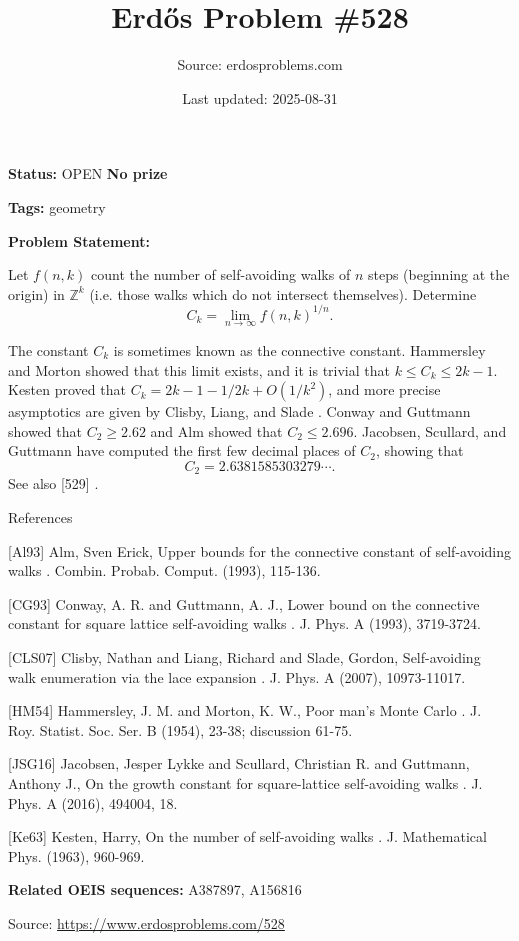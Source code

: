 \documentclass{article}
\title{Erd\H{o}s Problem \#528}
\date{Last updated: 2025-08-31}
\author{Source: erdosproblems.com}
\begin{document}
\maketitle

\noindent\textbf{Status:} OPEN \quad \textbf{No prize}

\noindent\textbf{Tags:} geometry

\medskip

\noindent\textbf{Problem Statement:}

Let $f(n,k)$ count the number of self-avoiding walks of $n$ steps (beginning at the origin) in $\mathbb{Z}^k$ (i.e. those walks which do not intersect themselves). Determine\[C_k=\lim_{n\to\infty}f(n,k)^{1/n}.\]




The constant $C_k$ is sometimes known as the connective constant. Hammersley and Morton \cite{HM54} showed that this limit exists, and it is trivial that $k\leq C_k\leq 2k-1$. Kesten \cite{Ke63} proved that $C_k=2k-1-1/2k+O(1/k^2)$, and more precise asymptotics are given by Clisby, Liang, and Slade \cite{CLS07}. Conway and Guttmann \cite{CG93} showed that $C_2\geq 2.62$ and Alm \cite{Al93} showed that $C_2\leq 2.696$. Jacobsen, Scullard, and Guttmann \cite{JSG16} have computed the first few decimal places of $C_2$, showing that\[C_2 = 2.6381585303279\cdots.\]See also [529] .




References

[Al93] Alm, Sven Erick, Upper bounds for the connective constant of self-avoiding walks . Combin. Probab. Comput. (1993), 115-136.

[CG93] Conway, A. R. and Guttmann, A. J., Lower bound on the connective constant for square lattice self-avoiding walks . J. Phys. A (1993), 3719-3724.

[CLS07] Clisby, Nathan and Liang, Richard and Slade, Gordon, Self-avoiding walk enumeration via the lace expansion . J. Phys. A (2007), 10973-11017.

[HM54] Hammersley, J. M. and Morton, K. W., Poor man's Monte Carlo . J. Roy. Statist. Soc. Ser. B (1954), 23-38; discussion 61-75.

[JSG16] Jacobsen, Jesper Lykke and Scullard, Christian R. and Guttmann, Anthony J., On the growth constant for square-lattice self-avoiding walks . J. Phys. A (2016), 494004, 18.

[Ke63] Kesten, Harry, On the number of self-avoiding walks . J. Mathematical Phys. (1963), 960-969.

\noindent\textbf{Related OEIS sequences:} A387897, A156816


\bigskip
\noindent\small{Source: \url{https://www.erdosproblems.com/528}}
\end{document}
